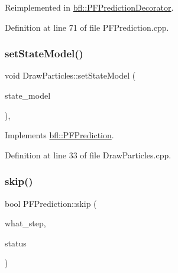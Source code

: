 Reimplemented in \mbox{\hyperlink{classbfl_1_1PFPredictionDecorator_a3c38ae386456ecd0fd1b609b381395ec}{bfl\+::\+P\+F\+Prediction\+Decorator}}.



Definition at line 71 of file P\+F\+Prediction.\+cpp.

\mbox{\label{classbfl_1_1DrawParticles_acb607ab90c22a43a72a75576acb898a4}} 
\subsubsection{\texorpdfstring{set\+State\+Model()}{setStateModel()}}
{\footnotesize\ttfamily void Draw\+Particles\+::set\+State\+Model (\begin{DoxyParamCaption}\item[{std\+::unique\+\_\+ptr$<$ \mbox{\hyperlink{classbfl_1_1StateModel}{State\+Model}} $>$}]{state\+\_\+model }\end{DoxyParamCaption})\hspace{0.3cm}{\ttfamily [override]}, {\ttfamily [virtual]}}



Implements \mbox{\hyperlink{classbfl_1_1PFPrediction_ac39683650d7f89c59f1426dd7743354e}{bfl\+::\+P\+F\+Prediction}}.



Definition at line 33 of file Draw\+Particles.\+cpp.

\mbox{\label{classbfl_1_1PFPrediction_a364cc35a151e5298c4024d681f3e04d9}} 
\subsubsection{\texorpdfstring{skip()}{skip()}}
{\footnotesize\ttfamily bool P\+F\+Prediction\+::skip (\begin{DoxyParamCaption}\item[{const std\+::string \&}]{what\+\_\+step,  }\item[{const bool}]{status }\end{DoxyParamCaption})\hspace{0.3cm}{\ttfamily [inherited]}}



